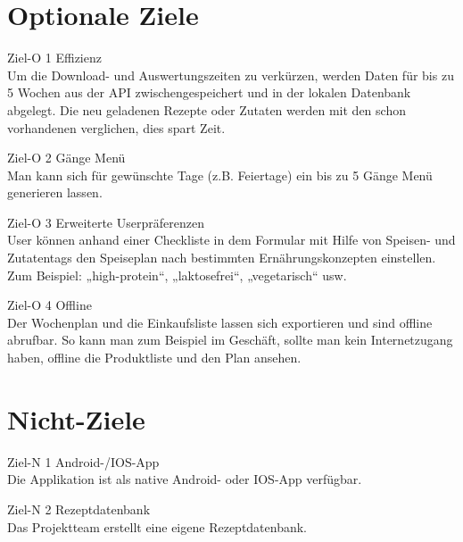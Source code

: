 \section{Optionale Ziele}
\begin{description}
\item Ziel-O 1      Effizienz\\
Um die Download- und Auswertungszeiten zu verkürzen, werden Daten für bis zu 5 Wochen aus der API zwischengespeichert und in der lokalen Datenbank abgelegt. Die neu geladenen Rezepte oder Zutaten werden mit den schon vorhandenen verglichen, dies spart Zeit. 

\item Ziel-O 2      Gänge Menü\\
Man kann sich für gewünschte Tage (z.B. Feiertage) ein bis zu 5 Gänge Menü generieren lassen.

\item Ziel-O 3      Erweiterte Userpräferenzen\\
User können anhand einer Checkliste in dem Formular mit Hilfe von Speisen- und Zutatentags den Speiseplan nach bestimmten Ernährungskonzepten einstellen. Zum Beispiel: „high-protein“, „laktosefrei“, „vegetarisch“ usw.

\item Ziel-O 4      Offline\\
Der Wochenplan und die Einkaufsliste lassen sich exportieren und sind offline abrufbar. So kann man zum Beispiel im Geschäft, sollte man kein Internetzugang haben, offline die Produktliste und den Plan ansehen.

\end{description}
\section{Nicht-Ziele}
\begin{description}
\item Ziel-N 1      Android-/IOS-App\\
Die Applikation ist als native Android- oder IOS-App verfügbar.

\item Ziel-N 2      Rezeptdatenbank\\
Das Projektteam erstellt eine eigene Rezeptdatenbank.

\end{description}
